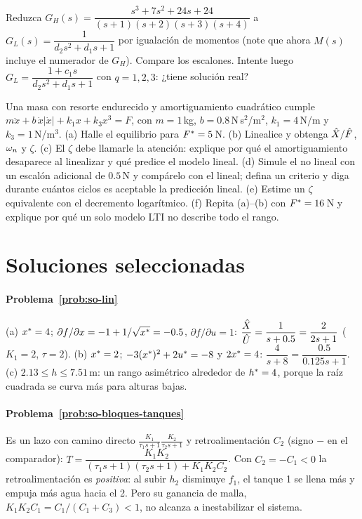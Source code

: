 \begin{problema}\label{prob:so-momentos}
\etiquetaM{} Reduzca $G_H(s)=\dfrac{s^3+7s^2+24s+24}{(s+1)(s+2)(s+3)(s+4)}$ a $G_L(s)=\dfrac{1}{d_2s^2+d_1s+1}$ por igualación de momentos (note que ahora $M(s)$ incluye el numerador de $G_H$). Compare los escalones. \etiquetaEstrella{} Intente luego $G_L=\dfrac{1+c_1s}{d_2s^2+d_1s+1}$ con $q=1,2,3$: ¿tiene solución real?
\end{problema}

\begin{problema}\label{prob:so-resorte}
\etiquetaEstrella{} Una masa con resorte endurecido y amortiguamiento cuadrático cumple $m\ddot x+b\,\dot x|\dot x|+k_1x+k_3x^3=F$, con $m=1$\,kg, $b=0.8$\,N\,s$^2$/m$^2$, $k_1=4$\,N/m y $k_3=1$\,N/m$^3$. (a) Halle el equilibrio para $F^{*}=5$\,N. (b) Linealice y obtenga $\hat{X}/\hat{F}$, $\omega_n$ y $\zeta$. (c) El $\zeta$ debe llamarle la atención: explique por qué el amortiguamiento desaparece al linealizar y qué predice el modelo lineal. (d) \etiquetaM{} Simule el no lineal con un escalón adicional de $0.5$\,N y compárelo con el lineal; defina un criterio y diga durante cuántos ciclos es aceptable la predicción lineal. (e) Estime un $\zeta$ equivalente con el decremento logarítmico. (f) Repita (a)--(b) con $F^{*}=16$\,N y explique por qué un solo modelo LTI no describe todo el rango.
\end{problema}

\section{Soluciones seleccionadas}

\paragraph{Problema~\ref{prob:so-lin}}
(a) $x^{*}=4$; $\partial f/\partial x=-1+1/\sqrt{x^{*}}=-0.5$, $\partial f/\partial u=1$: $\dfrac{\hat{X}}{\hat{U}}=\dfrac{1}{s+0.5}=\dfrac{2}{2s+1}$ ($K_1=2$, $\tau=2$). (b) $x^{*}=2$; $-3(x^{*})^2+2u^{*}=-8$ y $2x^{*}=4$: $\dfrac{4}{s+8}=\dfrac{0.5}{0.125s+1}$. (c) $2.13\leq h\leq7.51$\,m: un rango asimétrico alrededor de $h^{*}=4$, porque la raíz cuadrada se curva más para alturas bajas.

\paragraph{Problema~\ref{prob:so-bloques-tanques}}
Es un lazo con camino directo $\frac{K_1}{\tau_1s+1}\frac{K_2}{\tau_2s+1}$ y retroalimentación $C_2$ (signo $-$ en el comparador): $T=\dfrac{K_1K_2}{(\tau_1s+1)(\tau_2s+1)+K_1K_2C_2}$. Con $C_2=-C_1<0$ la retroalimentación es \emph{positiva}: al subir $h_2$ disminuye $f_1$, el tanque 1 se llena más y empuja más agua hacia el 2. Pero su ganancia de malla, $K_1K_2C_1=C_1/(C_1+C_3)<1$, no alcanza a inestabilizar el sistema.

